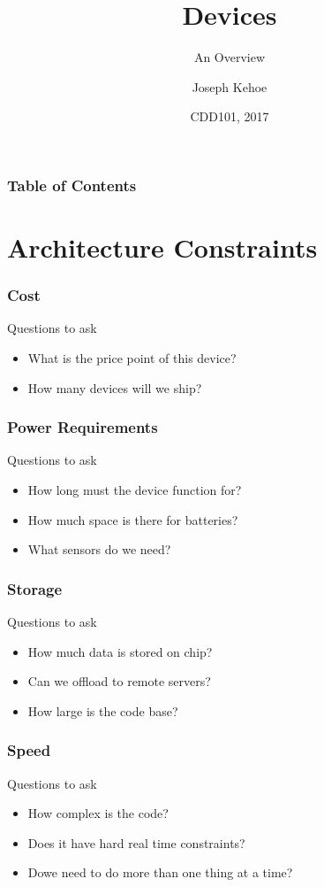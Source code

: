 \documentclass{beamer}
\title[Overview] %
{Devices}
\subtitle{An Overview}
\author[Dr. Joseph Kehoe] %
{Joseph Kehoe\inst{1}}
\institute[IT Carlow] %
{
	\inst{1}%
	Department of Computing and Networking\\
	Institute of Technology Carlow
}
\date[ITC 2017] %
{CDD101, 2017}
\begin{document}
 
\frame{\titlepage}
 
 
 
 \begin{frame}
 	\frametitle{Table of Contents}
 	\tableofcontents
 \end{frame}
 
 
 \section{Architecture Constraints}
\begin{frame}
	\frametitle{Cost}
	Questions to ask
	\begin{itemize}
	
		\item What is the price point of this device?
		\item How many devices will we ship?
		
	\end{itemize}
	
\end{frame}

\begin{frame}
	\frametitle{Power Requirements}
	Questions to ask
	\begin{itemize}
		
		\item How long must the device function for?
		\item How much space is there for batteries?
		\item What sensors do we need?
		
	\end{itemize}
	
\end{frame}

\begin{frame}
	\frametitle{Storage}
	Questions to ask
	\begin{itemize}
		
		\item How much data is stored on chip?
		\item Can we offload to remote servers?
		\item How large is the code base?
		
	\end{itemize}
	
\end{frame}

\begin{frame}
	\frametitle{Speed}
	Questions to ask
	\begin{itemize}
		
		\item How complex is the code?
		\item Does it have hard real time constraints?
		\item Dowe need to do more than one thing at a time?
		
	\end{itemize}
	
\end{frame}
\end{document}
